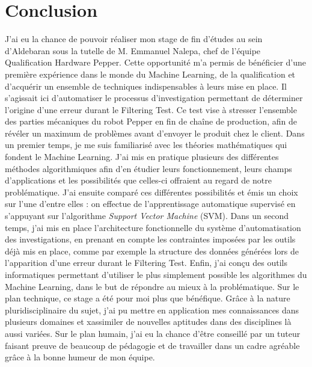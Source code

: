 \chapter{Conclusion}
\label{Conclusion}
\thispagestyle{fancy}

J'ai eu la chance de pouvoir réaliser mon stage de fin d'études au sein d'Aldebaran sous la tutelle de M. Emmanuel Nalepa, chef de l'équipe Qualification Hardware Pepper. Cette opportunité m'a permis de bénéficier d'une première expérience dans le monde du Machine Learning, de la qualification et d'acquérir un ensemble de techniques indispensables à leurs mise en place. Il s'agissait ici d'automatiser le processus d'investigation permettant de déterminer l'origine d'une erreur durant le Filtering Test. Ce test vise à stresser l'ensemble des parties mécaniques du robot Pepper en fin de chaîne de production, afin de révéler un maximum de problèmes avant d'envoyer le produit chez le client.
\newline
\newline
Dans un premier temps, je me suis familiarisé avec les théories mathématiques qui fondent le Machine Learning. J'ai mis en pratique plusieurs des différentes méthodes algorithmiques afin d'en étudier leurs fonctionnement, leurs champs d'applications et les possibilités que celles-ci offraient au regard de notre problématique. J'ai ensuite comparé ces différentes possibilités et émis un choix sur l'une d'entre elles : on effectue de l'apprentissage automatique supervisé en s'appuyant sur l'algorithme \emph{Support Vector Machine} (SVM).
\newline
Dans un second temps, j'ai mis en place l'architecture fonctionnelle du système d'automatisation des investigations, en prenant en compte les contraintes imposées par les outils déjà mis en place, comme par exemple la structure des données générées lors de l'apparition d'une erreur durant le Filtering Test. 
\newline
Enfin, j'ai conçu des outils informatiques permettant d'utiliser le plus simplement possible les algorithmes du Machine Learning, dans le but de répondre au mieux à la problématique. 
\newline
\newline
Sur le plan technique, ce stage a été pour moi plus que bénéfique. Grâce à la nature pluridisciplinaire du sujet, j'ai pu mettre en application mes connaissances dans plusieurs domaines et xassimiler de nouvelles aptitudes dans des disciplines là aussi variées. Sur le plan humain, j'ai eu la chance d’être conseillé par un tuteur faisant preuve de beaucoup de pédagogie et de travailler dans un cadre agréable grâce à la bonne humeur de mon équipe.